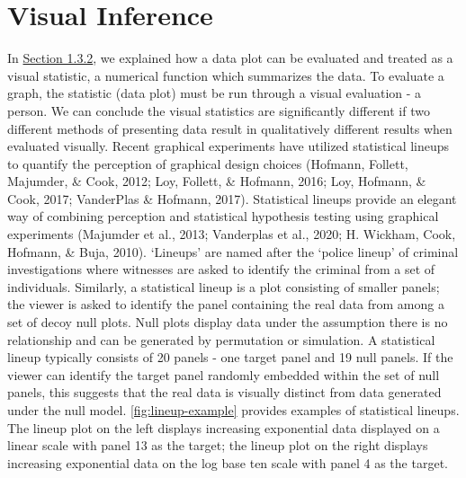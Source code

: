 \documentclass[print]{nuthesis}
\begin{document}
\hypertarget{visual-inference}{%
\section{Visual Inference}\label{visual-inference}}

In \protect\hyperlink{testing-statistical-graphics}{Section 1.3.2}, we explained how a data plot can be evaluated and treated as a visual statistic, a numerical function which summarizes the data.
To evaluate a graph, the statistic (data plot) must be run through a visual evaluation - a person.
We can conclude the visual statistics are significantly different if two different methods of presenting data result in qualitatively different results when evaluated visually.
Recent graphical experiments have utilized statistical lineups to quantify the perception of graphical design choices (Hofmann, Follett, Majumder, \& Cook, 2012; Loy, Follett, \& Hofmann, 2016; Loy, Hofmann, \& Cook, 2017; VanderPlas \& Hofmann, 2017).
Statistical lineups provide an elegant way of combining perception and statistical hypothesis testing using graphical experiments (Majumder et al., 2013; Vanderplas et al., 2020; H. Wickham, Cook, Hofmann, \& Buja, 2010).
`Lineups' are named after the `police lineup' of criminal investigations where witnesses are asked to identify the criminal from a set of individuals.
Similarly, a statistical lineup is a plot consisting of smaller panels; the viewer is asked to identify the panel containing the real data from among a set of decoy null plots.
Null plots display data under the assumption there is no relationship and can be generated by permutation or simulation.
A statistical lineup typically consists of 20 panels - one target panel and 19 null panels.
If the viewer can identify the target panel randomly embedded within the set of null panels, this suggests that the real data is visually distinct from data generated under the null model.
\cref{fig:lineup-example} provides examples of statistical lineups.
The lineup plot on the left displays increasing exponential data displayed on a linear scale with panel 13 as the target; the lineup plot on the right displays increasing exponential data on the log base ten scale with panel 4 as the target.
\end{document}
